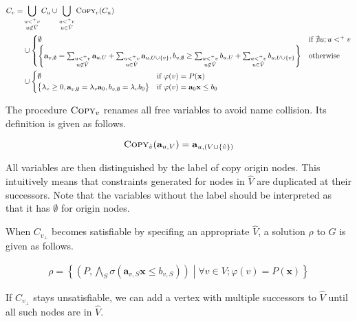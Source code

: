 \documentclass[a4paper,12pt]{article}
\begin{document}
\begin{align*}
C_v = & \bigcup_{\substack{u <^+ v \\ u \not\in \hat V}} C_u \cup
\bigcup_{\substack{u <^+ v \\ u \in \hat V}} \textsc{Copy}_v (C_u)
\\
& \cup \begin{cases}
\emptyset
& \mbox{if } \nexists u; u <^+ v \\
\left\lbrace
 \mathbf{a}_{v,\emptyset} =
  \sum_{\substack{u <^+ v \\ u \not\in \hat V}} \mathbf{a}_{u,U} +
  \sum_{\substack{u <^+ v \\ u \in \hat V}} \mathbf{a}_{u,U \cup \left\lbrace v \right\rbrace},
 b_{v,\emptyset} \geq
  \sum_{\substack{u <^+ v \\ u \not\in \hat V}} b_{u,U} +
  \sum_{\substack{u <^+ v \\ u \in \hat V}} b_{u,U \cup \left\lbrace v \right\rbrace}
\right\rbrace
& \mbox{otherwise}
\end{cases}
\\
& \cup \begin{cases}
\emptyset
& \mbox{if } \varphi(v) = P(\mathbf{x}) \\
\left\lbrace
 \lambda_v \geq 0, \mathbf{a}_{v,\emptyset} = \lambda_v \mathbf{a}_0,
 b_{v,\emptyset} = \lambda_v b_0
\right\rbrace
& \mbox{if } \varphi(v) = \mathbf{a}_0 \mathbf{x} \leq b_0
\end{cases}
\end{align*}

The procedure $\textsc{Copy}_v$ renames all free variables to avoid
name collision. Its definition is given as follows.

\[\textsc{Copy}_{\hat v}(\mathbf{a}_{u,V}) = \mathbf{a}_{u,(V \cup
  \left\lbrace \hat v \right\rbrace)} \]

All variables are then distinguished by the label of copy origin
nodes. This intuitively means that constraints generated for nodes in
$\hat V$ are duplicated at their successors. Note that the variables
without the label should be interpreted as that it has $\emptyset$ for
origin nodes.

When $C_{v_\bot}$ becomes satisfiable by specifing an appropriate
$\hat V$, a solution $\rho$ to $G$ is given as follows.

\begin{align*}
 \rho = \left\lbrace
  \left( P, \bigwedge_S \sigma(\mathbf{a}_{v,S} \mathbf{x} \leq b_{v,S}) \right) \middle|
  \forall v \in V; \varphi(v) = P(\mathbf{x})
 \right\rbrace
\end{align*}

If $C_{v_\bot}$ stays unsatisfiable, we can add a vertex with multiple
successors to $\hat V$ until all such nodes are in $\hat V$.
\end{document}
